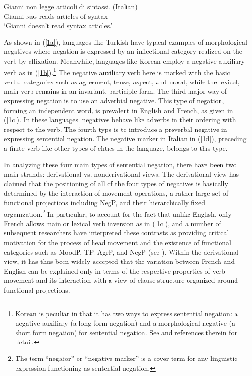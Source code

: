 \documentclass[output=paper
                ,modfonts
                		,nonflat
	        ,collection
	        ,collectionchapter
	        ,collectiontoclongg
 	        ,biblatex
                ,babelshorthands
                ,newtxmath
                ,draftmode
                ,colorlinks, citecolor=brown
]{./langsci/langscibook}
\begin{document}
{\ex \label{1d} %
\gll Gianni non legge articoli di sintassi. \hfil (Italian) \\
Gianni \textsc{neg} reads articles of syntax \\
\glt `Gianni doesn't read syntax articles.'
\zl

\noindent
As shown in (\ref{1a}), languages like Turkish
have typical examples of morphological negatives where
negation is expressed by an inflectional category realized on the
verb by affixation. Meanwhile, languages like Korean
 employ a negative auxiliary verb as in (\ref{1b}).\footnote{Korean
 is peculiar in that it has two ways to
 express sentential negation: a negative auxiliary (a long form
 negation)  and a morphological negative (a short form negation)
 for sentential negation. See \citet{Kim:00,Kim:16} and references therein for detail.}
  The negative auxiliary
 verb here is marked with the basic verbal categories such as agreement, tense, aspect, and mood, while the lexical, main verb remains in an invariant, participle form. The third major way of expressing negation is to use an adverbial
negative. This type of negation, forming an independent word, is prevalent in English and French, as given in (\ref{1c}). In these languages, negatives behave like adverbs in their ordering with respect to the verb. The fourth
type is to introduce a preverbal negative in
expressing sentential negation. The negative marker in Italian in (\ref{1d}), preceding a finite verb like other types of clitics in the language,
belongs to this type.


In analyzing these four main types of sentential negation, there have been two main strands: derivational vs. nonderivational views. The derivational view has claimed that the positioning of all of the
four types of negatives is basically determined by the interaction of movement
operations, a rather large set of functional projections including NegP,
and their hierarchically fixed organization.\footnote{The term ``negator'' or ``negative marker'' is a cover term for any linguistic expression functioning as sentential negation.}
In particular, to account for the
fact that unlike English, only French allows main or lexical verb inversion
as in (\ref{1c}), \citet{Pollock:89,Pollock:94} and a number of subsequent researchers
have interpreted these contrasts as providing critical motivation for
the process of head movement and the existence of functional
categories such as MoodP, TP, AgrP, and NegP (see \citealt{Belletti:90, Zanuttini:91, Zanuttini:97,Zanuttini:01, Chomsky:91,Chomsky:93,Chomsky:95, Lasnik:95, Haegeman:95,Haegeman:97, Vikner97a-u, Zeijlstra:15}).
Within the derivational view, it has thus been widely
accepted that the variation between French and English can be explained only in terms of the respective properties of verb movement and its interaction with a view of clause
structure organized around functional projections.


}
\end{document}
